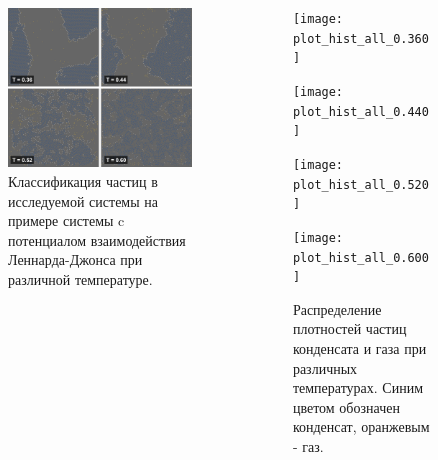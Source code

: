 \documentclass[pdf,hyperref={unicode}]{beamer}
\begin{document}
\begin{frame}
\transdissolve[duration=0.2]
\begin{columns}


\begin{column}{0.45\linewidth}
{
\begin{figure}[h]
\begin{center}
\includegraphics[width=\textwidth]{classification}
\caption{\tiny Классификация частиц в исследуемой системы на примере системы c потенциалом взаимодействия Леннарда-Джонса при различной температуре.}
\label{risClassExp}
\end{center}
\end{figure}
}
\end{column}

\begin{column}{0.55\linewidth}
{
\begin{figure}[h]
\begin{center}

\begin{minipage}[h]{0.47\linewidth}
\texttt{[image: plot\_hist\_all\_0.360]}
\end{minipage}
\begin{minipage}[h]{0.47\linewidth}
\texttt{[image: plot\_hist\_all\_0.440]}
\end{minipage}

\begin{minipage}[h]{0.47\linewidth}
\texttt{[image: plot\_hist\_all\_0.520]}
\end{minipage}
\begin{minipage}[h]{0.47\linewidth}
\texttt{[image: plot\_hist\_all\_0.600]}
\end{minipage}
\caption{\tiny Распределение плотностей частиц конденсата и газа при различных температурах. Синим цветом обозначен конденсат, оранжевым  - газ.}
\label{risRhoM}
\end{center}
\end{figure}
}
\end{column}

\end{columns}
\end{frame}
\end{document}
